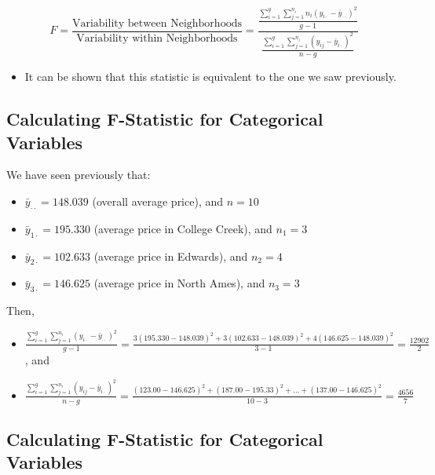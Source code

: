 \documentclass[]{book}
\providecommand{\tightlist}{%
  \setlength{\itemsep}{0pt}\setlength{\parskip}{0pt}}
\begin{document}
\[
F= \frac{\text{Variability between Neighborhoods}}{\text{Variability within Neighborhoods}}= \frac{\frac{\displaystyle\sum_{i=1}^g\sum_{j=1}^{n_i}n_i(y_{i\cdot}-\bar{y}_{\cdot\cdot})^2}{g-1}}{\frac{\displaystyle\sum_{i=1}^g\sum_{j=1}^{n_i}(y_{ij}-\bar{y}_{i\cdot})^2}{n-g}}
\]

\begin{itemize}
\tightlist
\item
  It can be shown that this statistic is equivalent to the one we saw
  previously.
\end{itemize}

\subsection{Calculating F-Statistic for Categorical
Variables}\label{calculating-f-statistic-for-categorical-variables}

We have seen previously that:

\begin{itemize}
\tightlist
\item
  \(\bar{y}_{\cdot\cdot}=148.039\) (overall average price), and \(n=10\)
\item
  \(\bar{y}_{1\cdot}=195.330\) (average price in College Creek), and
  \(n_1=3\)\\
\item
  \(\bar{y}_{2\cdot}=102.633\) (average price in Edwards), and
  \(n_2=4\)\\
\item
  \(\bar{y}_{3\cdot}=146.625\) (average price in North Ames), and
  \(n_3=3\)
\end{itemize}

Then,

\begin{itemize}
\item
  \(\frac{\displaystyle\sum_{i=1}^g\sum_{j=1}^{n_i}(y_{i\cdot}-\bar{y}_{\cdot\cdot})^2}{g-1} = \frac{3(195.330-148.039)^2+3(102.633-148.039)^2+4(146.625-148.039)^2}{3-1} = \frac{12902}{2}\),
  and
\item
  \(\frac{\displaystyle\sum_{i=1}^g\sum_{j=1}^{n_i}(y_{ij}-\bar{y}_{i\cdot})^2}{n-g} = \frac{(123.00-146.625)^2+ (187.00 - 195.33)^2 + \ldots + (137.00-146.625)^2}{10-3} = \frac{4656}{7}\)
\end{itemize}

\subsection{Calculating F-Statistic for Categorical
Variables}\label{calculating-f-statistic-for-categorical-variables-1}
\end{document}
